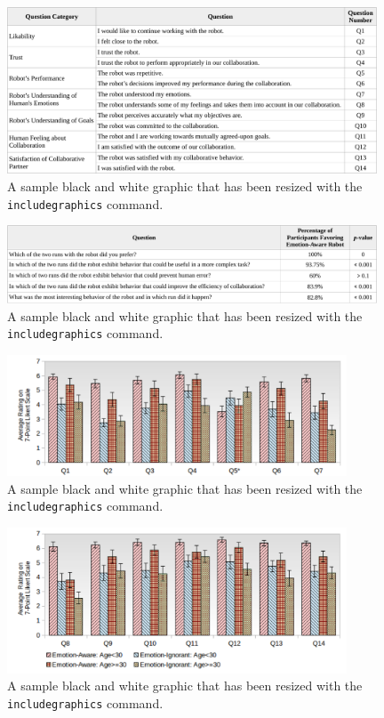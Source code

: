 \documentclass{sig-alternate-05-2015}
\begin{document}
\begin{figure}[tbh]
\centering
\includegraphics[width=0.98\textwidth]{figure/table1-croped.pdf}
\caption{A sample black and white graphic that has been resized with the
\texttt{includegraphics} command.}
\label{fig:14Questions-Table}
\end{figure}

\begin{figure}[tbh]
\centering
\includegraphics[width=0.98\textwidth]{figure/table2-croped.pdf}
\caption{A sample black and white graphic that has been resized with the
\texttt{includegraphics} command.}
\label{fig:Open-Ended-Table}
\end{figure}

\begin{figure}[tbh]
\centering
\includegraphics[width=0.9\textwidth]{figure/AgeComparison1.pdf}
\caption{A sample black and white graphic
that has been resized with the \texttt{includegraphics} command.}
\end{figure}

\begin{figure}[tbh]
\centering
\includegraphics[width=0.9\textwidth]{figure/AgeComparison2.pdf}
\caption{A sample black and white graphic
that has been resized with the \texttt{includegraphics} command.}
\end{figure}
\end{document}

